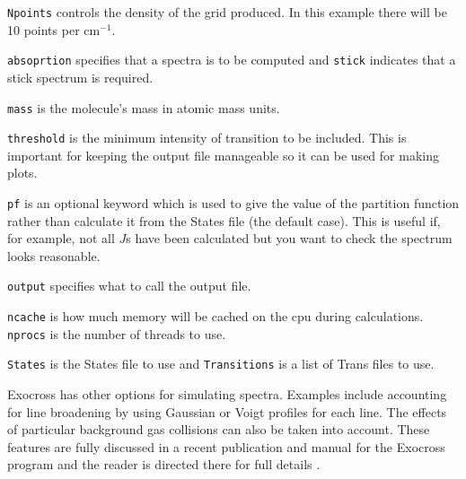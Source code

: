 \verb|Npoints| controls the density of the grid produced. In this example there will be
10 points per cm$^{-1}$. 

 \verb|absoprtion| specifies that a spectra is to be computed and \verb|stick| indicates
that a stick spectrum is required. 

\verb|mass| is the molecule's mass in atomic mass units. 

\verb|threshold| is the minimum intensity of transition to be included. This is important for keeping the output file
manageable so it can be used for making plots. 

\verb|pf| is an optional keyword which is used to give the value
of the partition function rather than calculate it from the States file (the default case). This is useful if, for example,
not all $J$s have been calculated but you want to check the spectrum looks reasonable. 


\verb|output| specifies what to call the output file. 

\verb|ncache| is how much memory will be cached on the cpu during calculations. \verb|nprocs| is the number of threads
to use.

\verb|States| is the States file to use and \verb|Transitions| is a list of Trans files to use. 



Exocross has other options for simulating spectra. Examples include accounting for line broadening by using Gaussian 
or Voigt profiles for each line. The effects of particular background gas collisions can also be taken into account.
These features are fully discussed in a recent publication and manual for the Exocross program and the reader is 
directed there for full details \cite{ExoCross}.

















